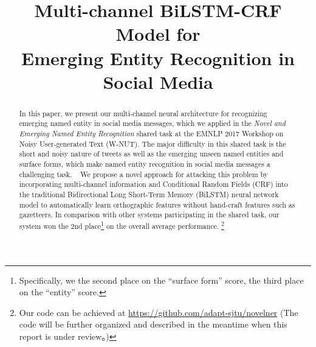\documentclass[11pt,letterpaper]{article}
\title{Multi-channel BiLSTM-CRF Model for\\  Emerging Entity Recognition in Social Media  }
\author{}
\begin{document}
\maketitle
\begin{abstract}
In this paper, we present our multi-channel neural architecture for recognizing emerging named entity in social media messages,
which we applied in the \textit{Novel and Emerging Named Entity Recognition} shared task at the EMNLP
2017 Workshop on Noisy User-generated Text (W-NUT). 
The major difficulty in this shared task is the short and noisy nature of tweets as well as the emerging unseen named entities and surface forms, which make
named entity recognition in social media messages a challenging task. ~
We propose a novel approach for attacking this problem by incorporating multi-channel information and Conditional Random Fields (CRF) into the traditional Bidirectional Long Short-Term Memory
(BiLSTM) neural network model to automatically learn orthographic features without hand-craft features such as gazetteers. 
In comparison with other systems participating in the shared task, our system won the 2nd place\footnote{Specifically, we the second place on the ``surface form'' score, the third place on the ``entity''  score.} on the overall average performance.
 \footnote{Our code can be achieved at \url{https://github.com/adapt-sjtu/novelner}  (The code will be further organized and described in the meantime when this report is under review。)}
\end{abstract}









\end{document}
